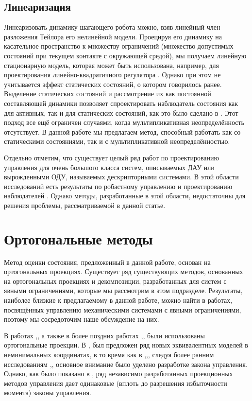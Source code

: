 \subsection{Линеаризация}\label{sec:ch1/sec2/sub5}
Линеаризовать динамику шагающего робота можно, взяв линейный член разложения Тейлора его нелинейной модели. Проецируя его динамику на касательное пространство к множеству ограничений (множество допустимых состояний при текущем контакте с окружающей средой), мы получаем линейную стационарную модель, которая может быть использована, например, для проектирования линейно-квадратичного регулятора \cite{mason2014full}. Однако при этом не учитывается эффект статических состояний, о котором говорилось ранее. Выделение статических состояний и рассмотрение их как постоянной составляющей динамики позволяет спроектировать наблюдатель состояния как для активных, так и для статических состояний, как это было сделано в \cite{SAVIN2021}. Этот подход все ещё ограничен случаями, когда мультипликативная неопределённость отсутствует. В данной работе мы предлагаем метод, способный работать как со статическими состояниями, так и с мультипликативной неопределённостью.

Отдельно отметим, что существует целый ряд работ по проектированию управления для очень большого класса систем, описываемых ДАУ или вырожденными ОДУ, называемых дескрипторными системами. В этой области исследований есть результаты по робастному управлению и проектированию наблюдателей \cite{Cheng2018, Darouach2014}. Однако методы, разработанные в этой области, недостаточны для решения проблемы, рассматриваемой в данной статье.

\section{Ортогональные методы}\label{sec:ch1/sec3}
Метод оценки состояния, предложенный в данной работе, основан на ортогональных проекциях. Существует ряд существующих методов, основанных на ортогональных проекциях и декомпозиции, разработанных для систем с явными ограничениями, которые мы рассмотрим в этом подразделе. Результаты, наиболее близкие к предлагаемому в данной работе, можно найти в работах, посвящённых управлению механическими системами с явными ограничениями, поэтому мы сосредоточим наше обсуждение на них.

В работах \cite{Aghili2003},\cite{Aghili2005}, а также в более поздних работах \cite{Mistry2010},\cite{Righetti2011},\cite{Righetti2013} были использованы ортогональные проекции. В \cite{Aghili2003},\cite{Aghili2005} был предложен ряд новых эквивалентных моделей в неминимальных координатах, в то время как в \cite{Mistry2010},\cite{Righetti2011},\cite{Righetti2013}, следуя более ранним исследованиям \cite{Khatib2007},\cite{Sentis2005}, основное внимание было уделено разработке закона управления. Однако, как было показано в \cite{Righetti2011}, ряд независимо разработанных проекционных методов управления дает одинаковые (вплоть до разрешения избыточности момента) законы управления.

